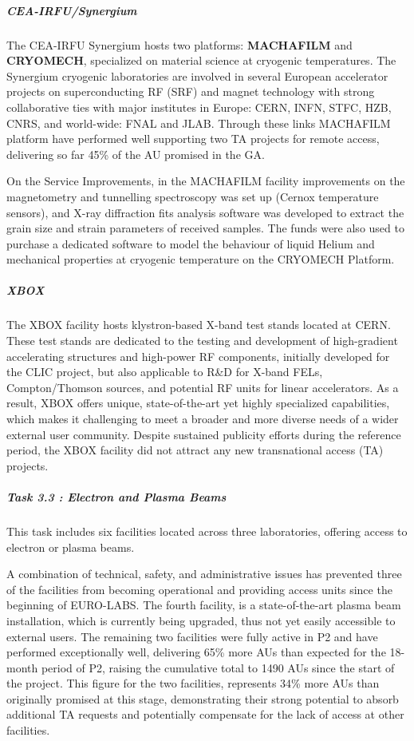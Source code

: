 \subparagraph{CEA-IRFU/Synergium}

The CEA-IRFU Synergium hosts two platforms: \textbf{MACHAFILM} and \textbf{CRYOMECH}, specialized on material science at cryogenic temperatures. The Synergium cryogenic laboratories are involved in several European accelerator projects on superconducting RF (SRF) and magnet technology with strong collaborative ties with major institutes in Europe: CERN, INFN, STFC, HZB, CNRS, and world-wide: FNAL and JLAB. Through these links MACHAFILM platform have performed well supporting two TA projects for remote access, delivering so far 45\% of the AU promised in the GA.

On the Service Improvements, in the MACHAFILM facility improvements on the magnetometry and tunnelling spectroscopy was set up (Cernox temperature sensors), and X-ray diffraction fits analysis software was developed to extract the grain size and strain parameters of received samples.  The funds were also used to purchase a  dedicated software to model the behaviour of liquid Helium and mechanical properties at cryogenic temperature on the CRYOMECH Platform.

\subparagraph{XBOX}

The XBOX facility hosts klystron-based X-band test stands located at CERN. These test stands are dedicated to the testing and development of high-gradient accelerating structures and high-power RF components, initially developed for the CLIC project, but also applicable to R\&D for X-band FELs, Compton/Thomson sources, and potential RF units for linear accelerators. As a result, XBOX offers unique, state-of-the-art yet highly specialized capabilities, which makes it challenging to meet a broader and more diverse needs of a wider external user community.
Despite sustained publicity efforts during the reference period, the XBOX facility did not attract any new transnational access (TA) projects. 

\subparagraph{Task 3.3 : Electron and Plasma Beams} \mbox{}


This task includes six facilities located across three laboratories, offering access to electron or plasma beams.

A combination of technical, safety, and administrative issues has prevented three of the facilities from becoming operational and providing access units since the beginning of EURO-LABS. The fourth facility, is a state-of-the-art plasma beam installation, which is currently being upgraded, thus not yet easily accessible to external users. The remaining two facilities were fully active in P2 and have performed exceptionally well, delivering 65\% more AUs than expected for the 18-month period of P2, raising the cumulative total to 1490 AUs since the start of the project. This figure for the two facilities, represents 34\% more AUs than originally promised at this stage, demonstrating their strong potential to absorb additional TA requests and potentially compensate for the lack of access at other facilities.

